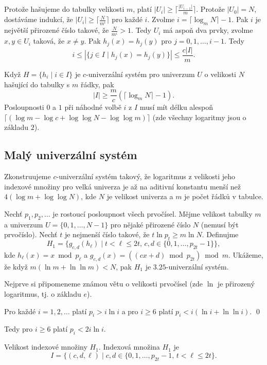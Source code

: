 \documentclass[a4paper,12pt]{article}
\begin{document}
Protože hašujeme do tabulky velikosti $m$, platí 
$|U_i|\ge\lceil\frac {|U_{i-1}|}m\rceil$. Protože $|U_0|=N$, dostáváme indukcí, že 
$|U_i|\ge\lceil\frac N{m^i}\rceil$ pro každé $i$. Zvolme $i=
\lceil\log_mN\rceil -1$. Pak $i$ je 
největší přirozené číslo takové, že $\frac 
N{m^i}>1$. Tedy $U_i$ má 
aspoň dva prvky, zvolme $x,y\in U_i$ taková, že $x\ne y$. Pak 
$h_j(x)=h_j(y)$ pro $j=0,1,\dots,i-1$. Tedy 
$$i\le |\{j\in I\mid h_j(x)=h_j(y)\}|\le\frac {c|I|}m.$$

\begin{veta}Když $H=\{h_i\mid i\in I\}$ je $c$-univerzální systém pro 
univerzum $U$ o velikosti $N$ hašující do tabulky s $m$ řádky, pak 
$$|I|\ge\frac mc(\lceil\log_mN\rceil -1).$$
Posloupnosti $0$ a $1$ při náhodné volbě $i$ z $I$ musí mít 
délku alespoň $\lceil (\log m-\log c+\log\log N-\log\log m)\rceil$ (zde všechny logaritmy 
jsou o základu $2$).
\end{veta}

\subsection{
Malý univerzální systém
}

Zkonstruujeme $c$-univerzální systém takový, 
že logaritmus z velikosti jeho indexové množiny pro velká 
univerza je až na aditivní konstantu menší než 
$4(\log m+\log\log N)$, kde $N$ je velikost univerza a $m$ je počet 
řádků v tabulce.  

Nechť $p_1,p_2,\dots$ je rostoucí posloupnost všech 
prvočísel. Měj\-me velikost tabulky $m$ a univerzum $U=
\{0,1,\dots,N-1\}$ pro 
nějaké přirozené číslo $N$ (nemusí být prvočíslo). Nechť $
t$ je 
nejmenší číslo takové, že $t\ln p_t\ge m\ln N$. Definujme 
$$H_1=\{g_{c,d}(h_{\ell})\mid t<\ell\le 2t,\,c,d\in \{0,1,\dots,p_{
2t}-1\}\},$$
kde $h_{\ell}(x)=x\bmod p_{\ell}$ a 
$g_{c,d}(x)=((cx+d)\bmod p_{2t})\bmod m$.\newline 
Ukážeme, že když $m(\ln m+\ln\ln m)<N$, pak $H_1$ je $
3.25$-univerzální systém. 

Nejprve si připomeneme známou větu o velikosti prvočísel 
(zde $\ln$ je přirozený logaritmus, tj. o základu $e$).

\begin{veta}Pro každé $i=1,2,\dots$ platí $p_i>i\ln 
i$ a pro $i\ge 6$ 
platí $p_i<i(\ln i+\ln\ln i)$. \qed
\end{veta}

Tedy pro $i\ge 6$ platí $p_i<2i\ln i$.

Velikost indexové množiny $H_1$.  Indexová množina $
H_1$ je 
$$I=\{(c,d,\ell )\mid c,d\in \{0,1,\dots,p_{2t}-1,\,t<\ell\le 2t\}
.$$
  
\end{document}
